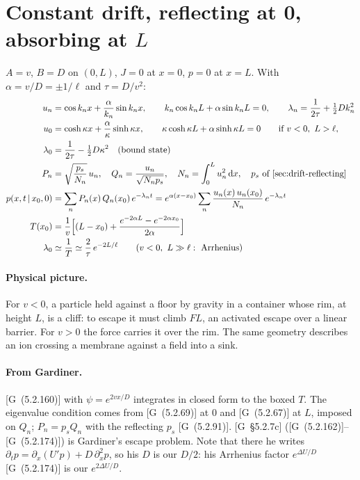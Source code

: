 \documentclass[11pt]{article}
\numberwithin{equation}{section}
\newcommand{\dd}{\mathrm{d}}
\newcommand{\given}{\,|\,}
\newcommand{\G}[1]{[G~(#1)]}
\newcommand{\Gs}[1]{[G~\S#1]}
\begin{document}
\section{Constant drift, reflecting at 0, absorbing at \texorpdfstring{$L$}{L}}
\label{sec:drift-mixed}

\begin{keyresults}
$A=v$, $B=D$ on $(0,L)$, $J=0$ at $x=0$, $p=0$ at $x=L$. With $\alpha=v/D=\pm1/\ell$ and $\tau=D/v^2$:
\begin{align}
  u_n &= \cos k_nx+\frac{\alpha}{k_n}\sin k_nx,\qquad k_n\cos k_nL+\alpha\sin k_nL=0,\qquad
  \lambda_n=\frac1{2\tau}+\tfrac12Dk_n^2 \label{eq:DM-k}\\
  u_0 &= \cosh\kappa x+\frac{\alpha}{\kappa}\sinh\kappa x,\qquad
  \kappa\cosh\kappa L+\alpha\sinh\kappa L=0\qquad\text{if } v<0,\ L>\ell, \notag\\
  \lambda_0 &= \frac1{2\tau}-\tfrac12D\kappa^2 \quad\text{(bound state)} \label{eq:DM-bound}\\
  P_n &= \sqrt{\frac{p_s}{N_n}}\,u_n,\quad Q_n=\frac{u_n}{\sqrt{N_np_s}},\quad N_n=\int_0^Lu_n^2\,\dd x,\quad
  p_s\ \text{of \cref{sec:drift-reflecting}} \\
  p(x,t\given x_0,0) &= \sum_nP_n(x)\,Q_n(x_0)\,e^{-\lambda_nt}=e^{\alpha(x-x_0)}\sum_n\frac{u_n(x)\,u_n(x_0)}{N_n}\,e^{-\lambda_nt} \\
  T(x_0) &= \frac1v\Bigl[(L-x_0)+\frac{e^{-2\alpha L}-e^{-2\alpha x_0}}{2\alpha}\Bigr] \\
  \lambda_0 &\simeq \frac1{T}\simeq\frac2\tau\,e^{-2L/\ell}\qquad(v<0,\ L\gg\ell:\ \text{Arrhenius})
\end{align}
\end{keyresults}

\paragraph{Physical picture.} For $v<0$, a particle held against a floor by gravity in a container whose rim, at
height $L$, is a cliff: to escape it must climb $FL$, an activated escape over a linear barrier. For $v>0$ the force
carries it over the rim. The same geometry describes an ion crossing a membrane against a field into a sink.

\paragraph{From Gardiner.} \G{5.2.160} with $\psi=e^{2vx/D}$ integrates in closed form to the boxed $T$. The
eigenvalue condition comes from \G{5.2.69} at $0$ and \G{5.2.67} at $L$, imposed on $Q_n$; $P_n=p_sQ_n$ with the
reflecting $p_s$ \G{5.2.91}. \Gs{5.2.7c}
(\G{5.2.162}--\G{5.2.174}) is Gardiner's escape problem. Note that there he writes
$\partial_tp=\partial_x(U'p)+D\,\partial_x^2p$, so his $D$ is our $D/2$: his Arrhenius factor
$e^{\Delta U/D}$ \G{5.2.174} is our $e^{2\Delta U/D}$.
\end{document}
